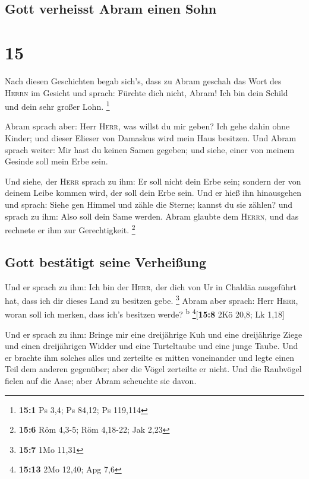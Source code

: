 \hypertarget{gott-verheisst-abram-einen-sohn}{%
\subsection{Gott verheisst Abram einen
Sohn}\label{gott-verheisst-abram-einen-sohn}}

\hypertarget{section-14}{%
\section{15}\label{section-14}}

 Nach diesen Geschichten begab sich's, dass zu Abram
geschah das Wort des \textsc{Herrn} im Gesicht und sprach: Fürchte dich
nicht, Abram! Ich bin dein Schild und dein sehr großer Lohn. \footnote{\textbf{15:1}
  Ps 3,4; Ps 84,12; Ps 119,114}

 Abram sprach aber: Herr \textsc{Herr}, was willst du mir
geben? Ich gehe dahin ohne Kinder; und dieser Elieser von Damaskus wird
mein Haus besitzen.  Und Abram sprach weiter: Mir hast du
keinen Samen gegeben; und siehe, einer von meinem Gesinde soll mein Erbe
sein.

 Und siehe, der \textsc{Herr} sprach zu ihm: Er soll nicht
dein Erbe sein; sondern der von deinem Leibe kommen wird, der soll dein
Erbe sein.  Und er hieß ihn hinausgehen und sprach: Siehe
gen Himmel und zähle die Sterne; kannst du sie zählen? und sprach zu
ihm: Also soll dein Same werden.  Abram glaubte dem
\textsc{Herrn}, und das rechnete er ihm zur Gerechtigkeit. \footnote{\textbf{15:6}
  Röm 4,3-5; Röm 4,18-22; Jak 2,23}

\hypertarget{gott-bestuxe4tigt-seine-verheiuxdfung}{%
\subsection{Gott bestätigt seine
Verheißung}\label{gott-bestuxe4tigt-seine-verheiuxdfung}}

 Und er sprach zu ihm: Ich bin der \textsc{Herr}, der dich
von Ur in Chaldäa ausgeführt hat, dass ich dir dieses Land zu besitzen
gebe. \footnote{\textbf{15:7} 1Mo 11,31}  Abram aber
sprach: Herr \textsc{Herr}, woran soll ich merken, dass ich's besitzen
werde? \textsuperscript{b} \footnote{\textbf{15:13} 2Mo 12,40; Apg 7,6}{[}\textbf{15:8}
2Kö 20,8; Lk 1,18{]}

 Und er sprach zu ihm: Bringe mir eine dreijährige Kuh und
eine dreijährige Ziege und einen dreijährigen Widder und eine
Turteltaube und eine junge Taube.  Und er brachte ihm
solches alles und zerteilte es mitten voneinander und legte einen Teil
dem anderen gegenüber; aber die Vögel zerteilte er nicht.
 Und die Raubvögel fielen auf die Aase; aber Abram
scheuchte sie davon.

